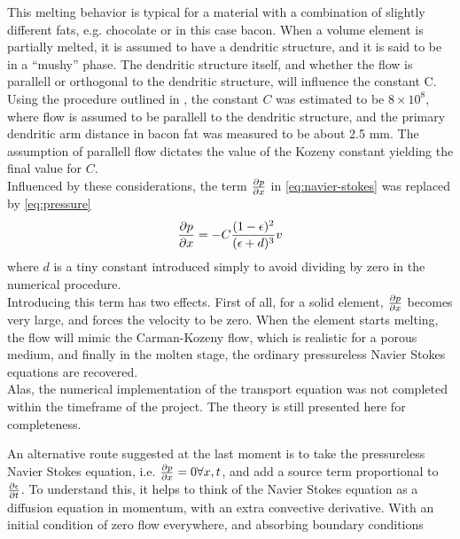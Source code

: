 This melting behavior is typical for a material with a combination of slightly different
fats, e.g. chocolate or in this case bacon. When a volume element is partially
melted, it is assumed to have a dendritic structure, and it is said to be in a
``mushy'' phase. The dendritic structure itself, and whether the flow is parallell or
orthogonal to the dendritic structure, will influence the constant C. \\

Using the procedure outlined in \cite{poirier}, the constant $C$ was estimated to be
$8 \times 10^8$, where flow is assumed to be parallell to the dendritic
structure, and the primary dendritic arm distance in bacon fat was measured to be
about 2.5 mm. The assumption of parallell flow dictates the value of the Kozeny
constant yielding the final value for $C$.\\

Influenced by these considerations, the term $\frac{\partial p}{\partial x}$ in
\cref{eq:navier-stokes} was replaced by \cref{eq:pressure}
\begin{equation}
  \frac{\partial p}{\partial x} =  -C\frac{ (1-\epsilon)^2}{(\epsilon+d)^3} v
  \label{eq:pressure}
\end{equation}
where $d$ is a tiny constant introduced simply to avoid dividing by zero in the
numerical procedure.\\

Introducing this term has two effects. First of all, for a solid element,
$\frac{\partial p}{\partial x}$ becomes very large, and forces the velocity to be zero. When the
element starts melting, the flow will mimic the Carman-Kozeny flow, which is
realistic for a porous medium, and finally in the molten stage, the ordinary
pressureless Navier Stokes equations are recovered.\\

Alas, the numerical implementation of the transport equation was not completed
within the timeframe of the project. The theory is still presented here for
completeness.

An alternative route suggested at the last moment is to take the pressureless
Navier Stokes equation, i.e. $\frac{\partial p}{\partial x} = 0 \forall x,t$, and add a source term
proportional to $\frac{\partial \epsilon}{\partial t}$. To understand this, it helps to think of the
Navier Stokes equation as a diffusion equation in momentum, with an extra
convective derivative. With an initial condition of zero flow everywhere, and
absorbing boundary conditions 

